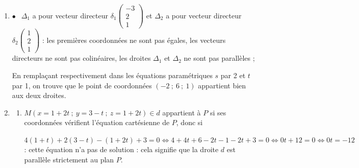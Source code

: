 \documentclass[10pt]{article}
\begin{document}
\begin{enumerate}
\item 
















$\bullet~~$ $\Delta_1$ a pour vecteur directeur $\delta_1\begin{pmatrix}-3\\2\\1\end{pmatrix}$ et $\Delta_2$ a pour vecteur directeur $\delta_2\begin{pmatrix}1\\2\\1\end{pmatrix}$ : les premières coordonnées ne sont pas égales, les vecteurs directeurs ne sont pas colinéaires, les droites $\Delta_1$ et $\Delta_2$ ne sont pas parallèles ; 





































En remplaçant respectivement dans les équations paramétriques $s$ par 2 et $t$ par 1, on trouve que le point de coordonnées $(-2~;~6~;~1)$ appartient bien aux deux droites.
\item 





	\begin{enumerate}
		\item 
$M(x = 1 + 2t~;~y = 3 - t~;~z = 1 + 2t) \in d$ appartient à $P$ si ses coordonnées vérifient l'équation cartésienne de $P$, donc si 

$4(1 + t) + 2(3 - t) -(1 + 2t) + 3 = 0 \iff 4 + 4t + 6 - 2t - 1 - 2t + 3 = 0 \iff 0t + 12 = 0 \iff 0t = -12$ : cette équation n'a pas de solution : cela signifie que la droite $d$ est parallèle strictement au plan $P$.





\end{enumerate}
\end{enumerate}
\end{document}
